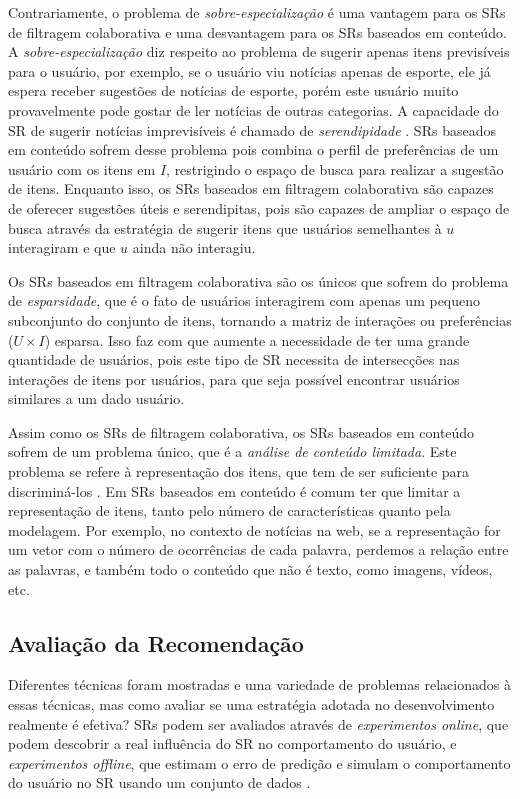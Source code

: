 \documentclass[normaltoc, espacoumemeio, pnumromarab,ruledheader]{abnt}
\begin{document}
Contrariamente, o problema de \textit{sobre-especialização} é uma vantagem para os SRs de filtragem colaborativa e uma desvantagem para os SRs baseados em conteúdo.
A \textit{sobre-especialização} diz respeito ao problema de sugerir apenas itens previsíveis para o usuário, por exemplo, se o usuário viu notícias apenas de esporte, ele já espera receber sugestões de notícias de esporte, porém este usuário muito provavelmente pode gostar de ler notícias de outras categorias.
A capacidade do SR de sugerir notícias imprevisíveis é chamado de \textit{serendipidade} \cite{Jannach2011,Lops2011}.
SRs baseados em conteúdo sofrem desse problema pois combina o perfil de preferências de um usuário com os itens em $I$, restrigindo o espaço de busca para realizar a sugestão de itens.
Enquanto isso, os SRs baseados em filtragem colaborativa são capazes de oferecer sugestões úteis e serendipitas, pois são capazes de ampliar o espaço de busca através da estratégia de sugerir itens que usuários semelhantes à $u$ interagiram e que $u$ ainda não interagiu.

Os SRs baseados em filtragem colaborativa são os únicos que sofrem do problema de \textit{esparsidade}, que é o fato de usuários interagirem com apenas um pequeno subconjunto do conjunto de itens, tornando a matriz de interações ou preferências ($U \times I$) esparsa.
Isso faz com que aumente a necessidade de ter uma grande quantidade de usuários, pois este tipo de SR necessita de intersecções nas interações de itens por usuários, para que seja possível encontrar usuários similares a um dado usuário.

Assim como os SRs de filtragem colaborativa, os SRs baseados em conteúdo sofrem de um problema único, que é a \textit{análise de conteúdo limitada}.
Este problema se refere à representação dos itens, que tem de ser suficiente para discriminá-los \cite{Lops2011}.
Em SRs baseados em conteúdo é comum ter que limitar a representação de itens, tanto pelo número de características quanto pela modelagem.
Por exemplo, no contexto de notícias na web, se a representação for um vetor com o número de ocorrências de cada palavra, perdemos a relação entre as palavras, e também todo o conteúdo que não é texto, como imagens, vídeos, etc.

 \subsection{Avaliação da Recomendação}
 \label{subsec:evalsr}

Diferentes técnicas foram mostradas e uma variedade de problemas relacionados à essas técnicas, mas como avaliar se uma estratégia adotada no desenvolvimento realmente é efetiva?
SRs podem ser avaliados através de \textit{experimentos online}, que podem descobrir a real influência do SR no comportamento do usuário, e \textit{experimentos offline}, que estimam o erro de predição e simulam o comportamento do usuário no SR usando um conjunto de dados \cite{Ricci22011}.
\end{document}
